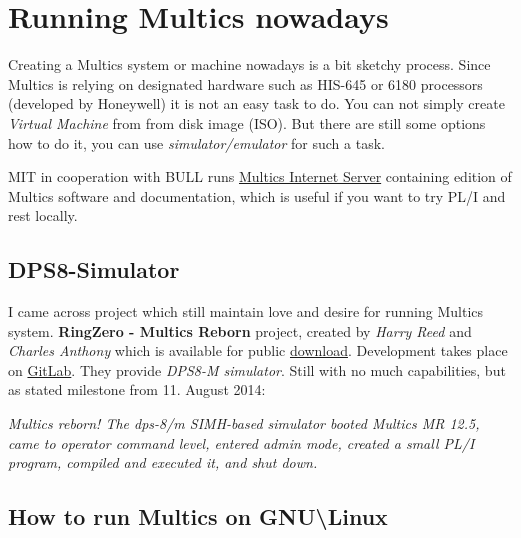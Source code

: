 %

\section{Running Multics nowadays}

Creating a Multics system or machine nowadays is a bit sketchy process. Since Multics is relying on designated hardware 
such as HIS-645 or 6180 processors (developed by Honeywell) it is not an easy task to do.
You can not simply create \textit{Virtual Machine} from from disk image (ISO). But there are still some options how to do it, 
you can use \textit{simulator/emulator} for such a task. 

MIT in cooperation with BULL runs \href{https://web.mit.edu/multics-history/source/Multics_Internet_Server/Multics_sources.html}{Multics Internet Server} \cite{mitBull}
containing edition of Multics software and documentation, which is useful if you want to try PL/I and rest locally.


\subsection{DPS8-Simulator}

I came across project which still maintain love and desire for running Multics system.
\textbf{RingZero - Multics Reborn} \cite{ringzero} project, created by \textit{Harry Reed} and \textit{Charles Anthony} which is available for 
public \href{http://ringzero.wikidot.com/}{download}. Development takes place on \href{https://gitlab.com/dps8m/dps8m}{GitLab}. 
They provide \textit{DPS8-M simulator}. Still with no much capabilities, but as stated milestone from 11. August 2014:

\begin{displayquote}
\textit{Multics reborn! The dps-8/m SIMH-based simulator booted Multics MR 12.5, came to operator command level, entered 
admin mode, created a small PL/I program, compiled and executed it, and shut down.} \cite{ringzero}
\end{displayquote}

\subsection{How to run Multics on GNU\textbackslash Linux}

